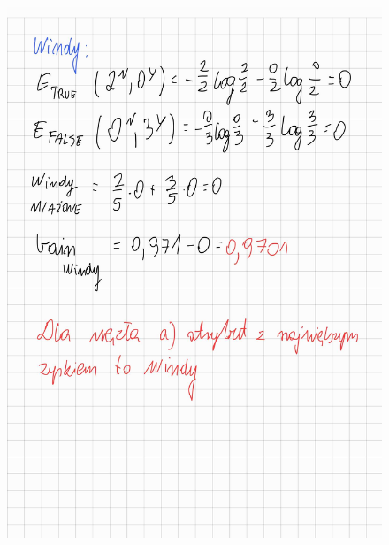 \documentclass{article}
\begin{document}
\begin{figure}[H]
    \centering
    \includegraphics[width=\textwidth]{tree5.jpg}
\end{figure}
\end{document}
